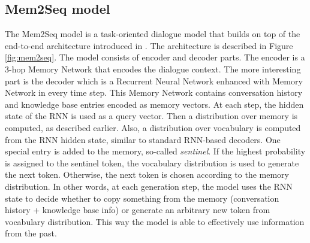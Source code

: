 \subsection{Mem2Seq model}
The Mem2Seq model \cite{madotto-etal-2018-mem2seq} is a task-oriented dialogue model that builds on top of the end-to-end architecture introduced in \citet{sukhbaatar2015end}.
The architecture is described in Figure \ref{fig:mem2seq}.
The model consists of encoder and decoder parts.
The encoder is a 3-hop Memory Network that encodes the dialogue context.
The more interesting part is the decoder which is a Recurrent Neural Network enhanced with Memory Network in every time step.
This Memory Network contains conversation history and knowledge base entries encoded as memory vectors.
At each step, the hidden state of the RNN is used as a query vector. Then a distribution over memory is computed, as described earlier. 
Also, a distribution over vocabulary is computed from the RNN hidden state, similar to standard RNN-based decoders.
One special entry is added to the memory, so-called \emph{sentinel}.
If the highest probability is assigned to the sentinel token, the vocabulary distribution is used to generate the next token.
Otherwise, the next token is chosen according to the memory distribution.
In other words, at each generation step, the model uses the RNN state to decide whether to copy something from the memory (conversation history + knowledge base info) or generate an arbitrary new token from vocabulary distribution.
This way the model is able to effectively use information from the past.

